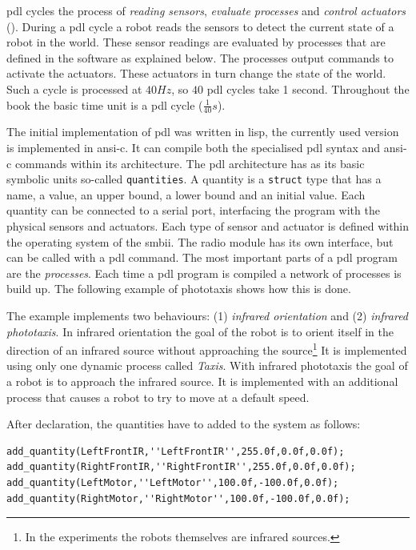 {\sc pdl} cycles the process of {\em reading sensors}, {\em evaluate processes} and {\em control actuators} (). During a {\sc pdl} cycle a robot reads the sensors to detect the current state of a robot in the world. These sensor readings are evaluated by processes that are defined in the software as explained below. The processes output commands to activate the actuators. These actuators in turn change the state of the world. Such a cycle is processed at $40 Hz$, so $40$ {\sc pdl} cycles take 1 second. Throughout the book the basic time unit is a {\sc pdl} cycle ($\frac{1}{40} s$).

The initial implementation of {\sc pdl} was written in {\sc lisp}, the currently used version is implemented in {\sc ansi-c}. It can compile both the specialised {\sc pdl} syntax and {\sc ansi-c} commands within its architecture. The {\sc pdl} architecture has as its basic symbolic units so-called \texttt{quantities}. A quantity is a \texttt{struct} type that has a {\sc name}, a {\sc value}, an {\sc upper bound}, a {\sc lower bound} and an {\sc initial value}. Each quantity can be connected to a serial port, interfacing the program with the physical sensors and actuators. Each type of sensor and actuator is defined within the operating system of the {\sc smbii}. The radio module has its own interface, but can be called with a {\sc pdl} command. The most important parts of a {\sc pdl} program are the {\em processes}. Each time a {\sc pdl} program is compiled a network of processes is build up. The following example of phototaxis shows how this is done.



The example implements two behaviours: (1) {\em infrared orientation} and (2) {\em infrared phototaxis}. In infrared orientation the goal of the robot is to orient itself in the direction of an infrared source without approaching the source\footnote{In the experiments the robots themselves are infrared sources.} It is implemented using only one dynamic process called {\em Taxis}. With infrared phototaxis the goal of a robot is to approach the infrared source. It is implemented with an additional process that causes a robot to try to move at a default speed. 


After declaration, the quantities have to added to the system as follows:


{\footnotesize\begin{verbatim}
add_quantity(LeftFrontIR,''LeftFrontIR'',255.0f,0.0f,0.0f);
add_quantity(RightFrontIR,''RightFrontIR'',255.0f,0.0f,0.0f);
add_quantity(LeftMotor,''LeftMotor'',100.0f,-100.0f,0.0f);
add_quantity(RightMotor,''RightMotor'',100.0f,-100.0f,0.0f);
\end{verbatim}}

